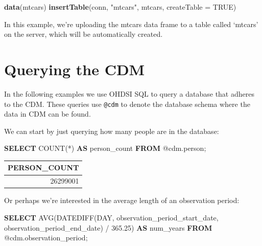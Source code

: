 \documentclass[11pt]{book}
\newenvironment{Shaded}{\begin{snugshade}}{\end{snugshade}}
\newcommand{\KeywordTok}[1]{\textcolor[rgb]{0.13,0.29,0.53}{\textbf{#1}}}
\newcommand{\DataTypeTok}[1]{\textcolor[rgb]{0.13,0.29,0.53}{#1}}
\newcommand{\FloatTok}[1]{\textcolor[rgb]{0.00,0.00,0.81}{#1}}
\newcommand{\StringTok}[1]{\textcolor[rgb]{0.31,0.60,0.02}{#1}}
\newcommand{\OtherTok}[1]{\textcolor[rgb]{0.56,0.35,0.01}{#1}}
\newcommand{\FunctionTok}[1]{\textcolor[rgb]{0.00,0.00,0.00}{#1}}
\newcommand{\NormalTok}[1]{#1}
\theoremstyle{definition}
\theoremstyle{definition}
\theoremstyle{definition}
\theoremstyle{remark}
\begin{document}
\begin{Shaded}
\begin{Highlighting}[]
\KeywordTok{data}\NormalTok{(mtcars)}
\KeywordTok{insertTable}\NormalTok{(conn, }\StringTok{"mtcars"}\NormalTok{, mtcars, }\DataTypeTok{createTable =} \OtherTok{TRUE}\NormalTok{)}
\end{Highlighting}
\end{Shaded}

In this example, we're uploading the mtcars data frame to a table called
`mtcars' on the server, which will be automatically created.

\section{Querying the CDM}\label{QueryTheCdm}

In the following examples we use OHDSI SQL to query a database that
adheres to the CDM. These queries use \texttt{@cdm} to denote the
database schema where the data in CDM can be found.

We can start by just querying how many people are in the database:

\begin{Shaded}
\begin{Highlighting}[]
\KeywordTok{SELECT} \FunctionTok{COUNT}\NormalTok{(*) }\KeywordTok{AS}\NormalTok{ person_count }\KeywordTok{FROM}\NormalTok{ @cdm.person;}
\end{Highlighting}
\end{Shaded}

\begin{longtable}[]{@{}r@{}}
\toprule
PERSON\_COUNT\tabularnewline
\midrule
\endhead
26299001\tabularnewline
\bottomrule
\end{longtable}

Or perhaps we're interested in the average length of an observation
period:

\begin{Shaded}
\begin{Highlighting}[]
\KeywordTok{SELECT} \FunctionTok{AVG}\NormalTok{(DATEDIFF(}\DataTypeTok{DAY}\NormalTok{, }
\NormalTok{                    observation_period_start_date, }
\NormalTok{                    observation_period_end_date) / }\FloatTok{365.25}\NormalTok{) }\KeywordTok{AS}\NormalTok{ num_years}
\KeywordTok{FROM}\NormalTok{ @cdm.observation_period;}
\end{Highlighting}
\end{Shaded}
\end{document}
